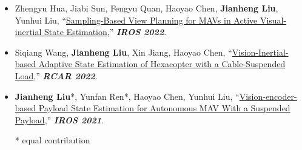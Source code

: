 \begin{itemize}
	\item Zhengyu Hua, Jiabi Sun, Fengyu Quan, Haoyao Chen, \textbf{Jianheng Liu}, Yunhui Liu, ``\href{https://ieeexplore.ieee.org/abstract/document/9981941/}{Sampling-Based View Planning for MAVs in Active Visual-inertial State Estimation},''
	\textbf{\emph{IROS 2022}}.\\
	\vspace{-8pt}
	\item Siqiang Wang, \textbf{Jianheng Liu}, Xin Jiang, Haoyao Chen, ``\href{https://ieeexplore.ieee.org/abstract/document/9872194}{Vision-Inertial-based Adaptive State Estimation of Hexacopter with a Cable-Suspended Load},''
	\textbf{\emph{RCAR 2022}}.\\
	\vspace{-8pt}
	\item \textbf{Jianheng Liu}*, Yunfan Ren*, Haoyao Chen, Yunhui Liu, ``\href{https://github.com/jianhengLiu/Vision-encoder-based-Payload-State-Estimator}{Vision-encoder-based Payload State Estimation for Autonomous MAV With a Suspended Payload},''
	\textbf{\emph{IROS 2021}}.\\
	\vspace{-8pt}

\footnotesize{* equal contribution}
\end{itemize}